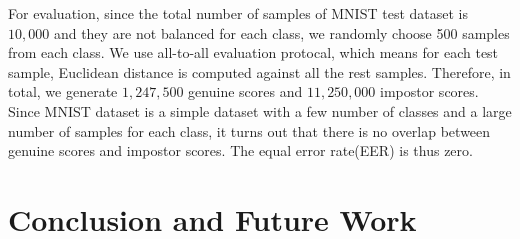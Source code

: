 \documentclass[12pt, a4paper]{article}
\begin{document}
\begin{spacing}{1}
    For evaluation, since the total number of samples of MNIST test dataset is $10,000$ and they are not balanced for each class, we randomly choose 500 samples from each class. We use all-to-all evaluation protocal, which means for each test sample, Euclidean distance is computed against all the rest samples. Therefore, in total, we generate $1,247,500$ genuine scores and $11,250,000$ impostor scores. Since MNIST dataset is a simple dataset with a few number of classes and a large number of samples for each class, it turns out that there is no overlap between genuine scores and impostor scores. The equal error rate(EER) is thus zero.

    \section{Conclusion and Future Work}
    \label{sec:conclusion}

       





\end{spacing}
\end{document}
